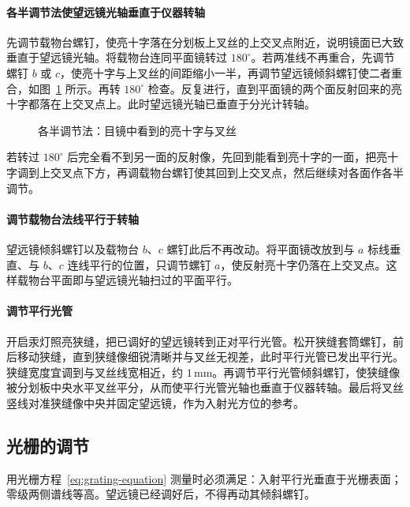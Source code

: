 \documentclass{../template/myrpt}
\begin{document}
\paragraph{各半调节法使望远镜光轴垂直于仪器转轴}
先调节载物台螺钉，使亮十字落在分划板上叉丝的上交叉点附近，说明镜面已大致垂直于望远镜光轴。将载物台连同平面镜转过 $180^\circ$。若两准线不再重合，先调节螺钉 $b$ 或 $c$，使亮十字与上叉丝的间距缩小一半，再调节望远镜倾斜螺钉使二者重合，如图~\ref{fig:half-adjust} 所示。再转 $180^\circ$ 检查。反复进行，直到平面镜的两个面反射回来的亮十字都落在上交叉点上。此时望远镜光轴已垂直于分光计转轴。

\begin{figure}[!htbp]
  \centering
  
  \caption{各半调节法：目镜中看到的亮十字与叉丝}
  \label{fig:half-adjust}
\end{figure}

若转过 $180^\circ$ 后完全看不到另一面的反射像，先回到能看到亮十字的一面，把亮十字调到上交叉点下方，再调载物台螺钉使其回到上交叉点，然后继续对各面作各半调节。

\paragraph{调节载物台法线平行于转轴}
望远镜倾斜螺钉以及载物台 $b$、$c$ 螺钉此后不再改动。将平面镜改放到与 $a$ 标线垂直、与 $b$、$c$ 连线平行的位置，只调节螺钉 $a$，使反射亮十字仍落在上交叉点。这样载物台平面即与望远镜光轴扫过的平面平行。

\paragraph{调节平行光管}
开启汞灯照亮狭缝，把已调好的望远镜转到正对平行光管。松开狭缝套筒螺钉，前后移动狭缝，直到狭缝像细锐清晰并与叉丝无视差，此时平行光管已发出平行光。狭缝宽度宜调到与叉丝线宽相近，约 $1\,\si{\milli\metre}$。再调节平行光管倾斜螺钉，使狭缝像被分划板中央水平叉丝平分，从而使平行光管光轴也垂直于仪器转轴。最后将叉丝竖线对准狭缝像中央并固定望远镜，作为入射光方位的参考。

\subsection{光栅的调节}

用光栅方程~\eqref{eq:grating-equation} 测量时必须满足：入射平行光垂直于光栅表面；零级两侧谱线等高。望远镜已经调好后，不得再动其倾斜螺钉。
\end{document}
